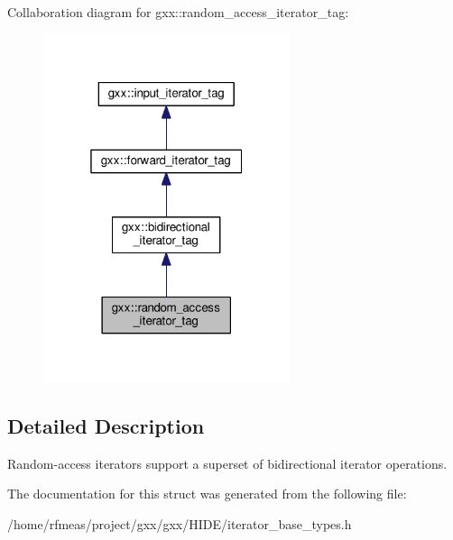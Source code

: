 Collaboration diagram for gxx\+:\+:random\+\_\+access\+\_\+iterator\+\_\+tag\+:
\nopagebreak
\begin{figure}[H]
\begin{center}
\leavevmode
\includegraphics[width=205pt]{structgxx_1_1random__access__iterator__tag__coll__graph}
\end{center}
\end{figure}


\subsection{Detailed Description}
Random-\/access iterators support a superset of bidirectional iterator operations. 

The documentation for this struct was generated from the following file\+:\begin{DoxyCompactItemize}
\item 
/home/rfmeas/project/gxx/gxx/\+H\+I\+D\+E/iterator\+\_\+base\+\_\+types.\+h\end{DoxyCompactItemize}
